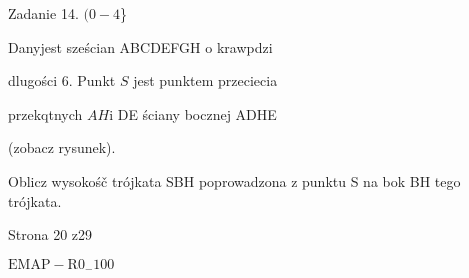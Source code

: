 \documentclass[a4paper,12pt]{article}
\begin{document}
Zadanie 14. $(0-4$\}

Danyjest sześcian ABCDEFGH o krawpdzi

dlugości 6. Punkt $S$ jest punktem przeciecia

przekqtnych $AH \mathrm{i}$ DE ściany bocznej ADHE

(zobacz rysunek).

Oblicz wysokośč trójkata SBH poprowadzona z punktu S na bok BH tego trójkata.

Strona 20 z29

$\mathrm{E}\mathrm{M}\mathrm{A}\mathrm{P}-\mathrm{R}0_{-}100$
\end{document}
